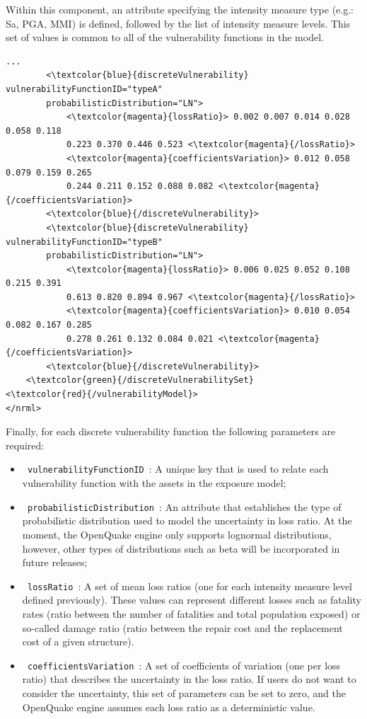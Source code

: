 Within this component, an attribute specifying the intensity measure type (e.g.: Sa, PGA, MMI) is defined, followed by the list of intensity measure levels. This set of values is common to all of the \glspl{vulnerability function} in the model.

\begin{Verbatim}[frame=single, commandchars=\\\{\}, samepage=true]
        ...
        <\textcolor{blue}{discreteVulnerability}  vulnerabilityFunctionID="typeA" 
        probabilisticDistribution="LN">
            <\textcolor{magenta}{lossRatio}> 0.002 0.007 0.014 0.028 0.058 0.118
            0.223 0.370 0.446 0.523 <\textcolor{magenta}{/lossRatio}>
            <\textcolor{magenta}{coefficientsVariation}> 0.012 0.058 0.079 0.159 0.265 
            0.244 0.211 0.152 0.088 0.082 <\textcolor{magenta}{/coefficientsVariation}>
        <\textcolor{blue}{/discreteVulnerability}>
        <\textcolor{blue}{discreteVulnerability}  vulnerabilityFunctionID="typeB" 
        probabilisticDistribution="LN">
            <\textcolor{magenta}{lossRatio}> 0.006 0.025 0.052 0.108 0.215 0.391	
            0.613 0.820 0.894 0.967 <\textcolor{magenta}{/lossRatio}>
            <\textcolor{magenta}{coefficientsVariation}> 0.010 0.054 0.082 0.167 0.285 
            0.278 0.261 0.132 0.084 0.021 <\textcolor{magenta}{/coefficientsVariation}>
        <\textcolor{blue}{/discreteVulnerability}>
    <\textcolor{green}{/discreteVulnerabilitySet} 
<\textcolor{red}{/vulnerabilityModel}>        
</nrml>
\end{Verbatim}

Finally, for each discrete \gls{vulnerability function} the following parameters are required:
\begin{itemize}
\item  \Verb+ vulnerabilityFunctionID +: A unique key that is used to relate each \gls{vulnerability function} with the \glspl{asset} in the \gls{exposure model};
\item  \Verb+ probabilisticDistribution +: An attribute that establishes the type of probabilistic distribution used to model the uncertainty in loss ratio. At the moment, the OpenQuake engine only supports lognormal distributions, however, other types of distributions such as beta will be incorporated in future releases;
\item  \Verb+ lossRatio +: A set of mean loss ratios (one for each intensity measure level defined previously). These values can represent different losses such as fatality rates (ratio between the number of fatalities and total population exposed) or so-called damage ratio (ratio between the repair cost and the replacement cost of a given structure).
\item  \Verb+ coefficientsVariation +: A set of coefficients of variation (one per loss ratio) that describes the uncertainty in the loss ratio. If users do not want to consider the uncertainty, this set of parameters can be set to zero, and the OpenQuake engine assumes each loss ratio as a deterministic value. 
\end{itemize}

